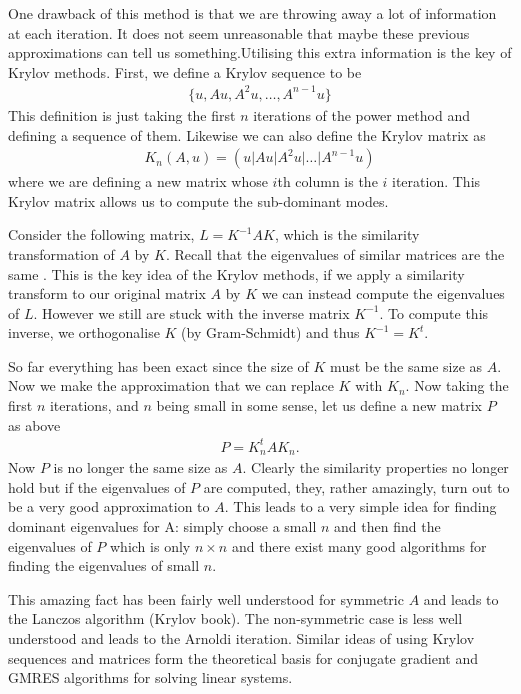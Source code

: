One drawback of this method is that we are throwing away a lot of information at each iteration. It does not seem unreasonable that maybe these previous approximations can tell us something.Utilising this extra information is the key of Krylov methods. First, we define a Krylov sequence to be 
\begin{align}
\{u,Au,A^{2}u,\ldots,A^{n-1}u\}
\end{align}
This definition is just taking the first $n$ iterations of the power method and defining a sequence of them. Likewise we can also define the Krylov matrix as 
\begin{align}
K_{n}(A,u)=(u|Au|A^{2}u|\ldots|A^{n-1}u)
\end{align}
where we are defining a new matrix whose $i$th column is the $i$ iteration. This Krylov matrix allows us to compute the sub-dominant modes.  

Consider the following matrix, $L=K^{-1}AK$, which is the similarity transformation of $A$ by $K$. Recall that the eigenvalues of similar matrices are the same \cite{MeyerLinAlg}. This is the key idea of the Krylov methods, if we apply a similarity transform to our original matrix $A$ by $K$ we can instead compute the eigenvalues of $L$. However we still are stuck with the inverse matrix $K^{-1}$. To compute this inverse, we orthogonalise $K$ (by Gram-Schmidt) and thus $K^{-1}=K^{t}$. 

So far everything has been exact since the size of $K$ must be the same size as $A$. Now we make the approximation that we can replace $K$ with $K_{n}$. Now taking the first $n$ iterations, and $n$ being small in some sense, let us define a new matrix $P$ as above
\begin{align}
P=K_{n}^{t}AK_{n}.
\end{align}
Now $P$ is no longer the same size as $A$. Clearly the similarity properties no longer hold but if the eigenvalues of $P$ are computed, they, rather amazingly, turn out to be a very good approximation to $A$. This leads to a very simple idea for finding dominant eigenvalues for A: simply choose a small $n$ and then find the eigenvalues of $P$ which is only $n\times n$ and there exist many good algorithms for finding the eigenvalues of small $n$. 

This amazing fact has been fairly well understood for symmetric $A$ and leads to the Lanczos algorithm \cite{MeyerLinAlg} (Krylov book). The non-symmetric case is less well understood and leads to the Arnoldi iteration. Similar ideas of using Krylov sequences and matrices form the theoretical basis for conjugate gradient and GMRES algorithms for solving linear systems.  


